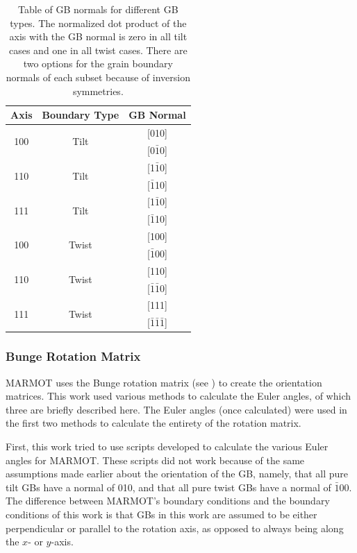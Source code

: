 \documentclass[twoside,senior]{BYUPhys}
\begin{document}
\begin{table}[ht!]
\centering
\caption{\label{table:geometricgbnorms}Table of GB normals for different GB types. The normalized dot product of the axis with the GB normal is zero in all tilt cases and one in all twist cases.  There are two options for the grain boundary normals of each subset because of inversion symmetries.}

\begin{tabular}{ccc}
Axis & Boundary Type & GB Normal \\
\hline
\hline
\multirow{2}{*}{\textlangle{}100\textrangle{}} & \multirow{2}{*}{Tilt} & [010] \\
                              & & [0$\bar{1}$0] \\
\hline
\multirow{2}{*}{\textlangle{}110\textrangle{}} & \multirow{2}{*}{Tilt} & [1$\bar{1}$0] \\
							  & & [$\bar{1}$10] \\
\hline
\multirow{2}{*}{\textlangle{}111\textrangle{}} & \multirow{2}{*}{Tilt} & [1$\bar{1}$0] \\
							  & & [$\bar{1}$10] \\
\hline
\multirow{2}{*}{\textlangle{}100\textrangle{}} & \multirow{2}{*}{Twist} & [100] \\
							  & & [$\bar{1}$00] \\
\hline
\multirow{2}{*}{\textlangle{}110\textrangle{}} & \multirow{2}{*}{Twist} & [110] \\
							  & & [$\bar{1}\bar{1}$0] \\
\hline
\multirow{2}{*}{\textlangle{}111\textrangle{}} & \multirow{2}{*}{Twist} & [111] \\
							  & & [$\bar{1}\bar{1}\bar{1}$] \\
\hline
\hline
\end{tabular}
\end{table}

\subsubsection{Bunge Rotation Matrix\label{PQ:BungeMat}}
MARMOT uses the Bunge rotation matrix (see ) to create the orientation matrices.  This work used various methods to calculate the Euler angles, of which three are briefly described here. The Euler angles (once calculated) were used in the first two methods to calculate the entirety of the rotation matrix.

First, this work tried to use scripts developed to calculate the various Euler angles for MARMOT.  These scripts did not work because of the same assumptions made earlier about the orientation of the GB, namely, that all pure tilt GBs have a normal of 010, and that all pure twist GBs have a normal of $\bar{1}$00.  The difference between MARMOT's boundary conditions and the boundary conditions of this work is that GBs in this work are assumed to be either perpendicular or parallel to the rotation axis, as opposed to always being along the $x$- or $y$-axis.
\end{document}
